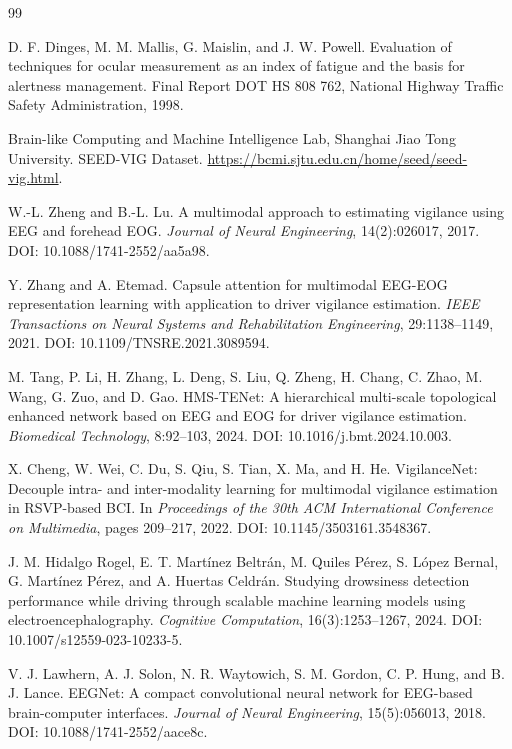 \documentclass[UTF8,a4paper,10pt,fontset=windows]{ctexart}
\begin{document}
\small
\begin{thebibliography}{99}

D. F. Dinges, M. M. Mallis, G. Maislin, and J. W. Powell.
Evaluation of techniques for ocular measurement as an index of fatigue and the basis for alertness management.
Final Report DOT HS 808 762, National Highway Traffic Safety Administration, 1998.

Brain-like Computing and Machine Intelligence Lab, Shanghai Jiao Tong University.
SEED-VIG Dataset. \url{https://bcmi.sjtu.edu.cn/home/seed/seed-vig.html}.

W.-L. Zheng and B.-L. Lu.
A multimodal approach to estimating vigilance using EEG and forehead EOG.
\textit{Journal of Neural Engineering}, 14(2):026017, 2017. DOI: 10.1088/1741-2552/aa5a98.

Y. Zhang and A. Etemad.
Capsule attention for multimodal EEG-EOG representation learning with application to driver vigilance estimation.
\textit{IEEE Transactions on Neural Systems and Rehabilitation Engineering}, 29:1138--1149, 2021. DOI: 10.1109/TNSRE.2021.3089594.

M. Tang, P. Li, H. Zhang, L. Deng, S. Liu, Q. Zheng, H. Chang, C. Zhao, M. Wang, G. Zuo, and D. Gao.
HMS-TENet: A hierarchical multi-scale topological enhanced network based on EEG and EOG for driver vigilance estimation.
\textit{Biomedical Technology}, 8:92--103, 2024. DOI: 10.1016/j.bmt.2024.10.003.

X. Cheng, W. Wei, C. Du, S. Qiu, S. Tian, X. Ma, and H. He.
VigilanceNet: Decouple intra- and inter-modality learning for multimodal vigilance estimation in RSVP-based BCI.
In \textit{Proceedings of the 30th ACM International Conference on Multimedia}, pages 209--217, 2022. DOI: 10.1145/3503161.3548367.

J. M. Hidalgo Rogel, E. T. Martínez Beltrán, M. Quiles Pérez, S. López Bernal, G. Martínez Pérez, and A. Huertas Celdrán.
Studying drowsiness detection performance while driving through scalable machine learning models using electroencephalography.
\textit{Cognitive Computation}, 16(3):1253--1267, 2024. DOI: 10.1007/s12559-023-10233-5.

V. J. Lawhern, A. J. Solon, N. R. Waytowich, S. M. Gordon, C. P. Hung, and B. J. Lance.
EEGNet: A compact convolutional neural network for EEG-based brain-computer interfaces.
\textit{Journal of Neural Engineering}, 15(5):056013, 2018. DOI: 10.1088/1741-2552/aace8c.


\end{thebibliography}
\end{document}
